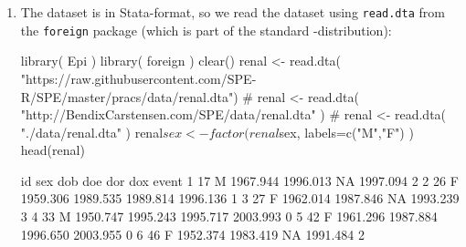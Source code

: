 \begin{enumerate}


\item The dataset is in Stata-format, so we read the dataset
  using \texttt{read.dta} from the \texttt{foreign} package (which is
  part of the standard \R-distribution):
\begin{Schunk}
\begin{Sinput}
 library( Epi )
 library( foreign )
 clear()
 renal <- read.dta(
          "https://raw.githubusercontent.com/SPE-R/SPE/master/pracs/data/renal.dta")
 # renal <- read.dta( "http://BendixCarstensen.com/SPE/data/renal.dta" )
 # renal <- read.dta( "./data/renal.dta" )
 renal$sex <- factor( renal$sex, labels=c("M","F") )
 head(renal)
\end{Sinput}
\begin{Soutput}
  id sex      dob      doe      dor      dox event
1 17   M 1967.944 1996.013       NA 1997.094     2
2 26   F 1959.306 1989.535 1989.814 1996.136     1
3 27   F 1962.014 1987.846       NA 1993.239     3
4 33   M 1950.747 1995.243 1995.717 2003.993     0
5 42   F 1961.296 1987.884 1996.650 2003.955     0
6 46   F 1952.374 1983.419       NA 1991.484     2
\end{Soutput}
\end{Schunk}



\end{enumerate}
